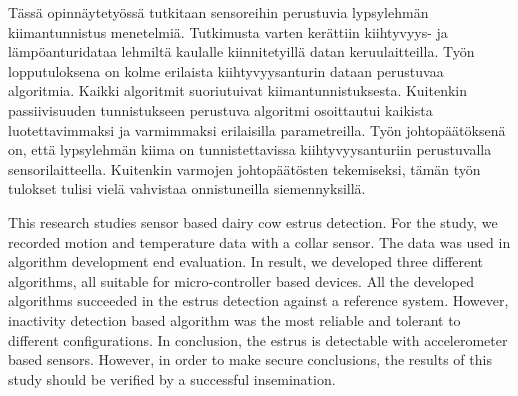 
\begin{abstractpage}[finnish]
Tässä opinnäytetyössä tutkitaan sensoreihin perustuvia lypsylehmän kiimantunnistus menetelmiä. Tutkimusta varten kerättiin kiihtyvyys- ja lämpöanturidataa lehmiltä kaulalle kiinnitetyillä datan keruulaitteilla. Työn lopputuloksena on kolme erilaista kiihtyvyysanturin dataan perustuvaa algoritmia. Kaikki algoritmit suoriutuivat kiimantunnistuksesta. Kuitenkin passiivisuuden tunnistukseen perustuva algoritmi osoittautui kaikista luotettavimmaksi ja varmimmaksi erilaisilla parametreilla. Työn johtopäätöksenä on, että lypsylehmän kiima on tunnistettavissa kiihtyvyysanturiin perustuvalla sensorilaitteella. Kuitenkin varmojen johtopäätösten tekemiseksi, tämän työn tulokset tulisi vielä vahvistaa onnistuneilla siemennyksillä.
\end{abstractpage}

\newpage
%
\begin{abstractpage}[english]
This research studies sensor based dairy cow estrus detection. For the study, we recorded motion and temperature data with a collar sensor. The data was used in algorithm development end evaluation. In result, we developed three different algorithms, all suitable for micro-controller based devices. All the developed algorithms succeeded in the estrus detection against a reference system. However, inactivity detection based algorithm was the most reliable and tolerant to different configurations. In conclusion, the estrus is detectable with accelerometer based sensors. However, in order to make secure conclusions, the results of this study should be verified by a successful insemination. 
\end{abstractpage}

